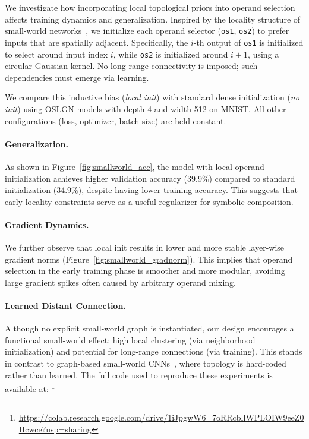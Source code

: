 We investigate how incorporating local topological priors into operand selection affects training dynamics and generalization. Inspired by the locality structure of small-world networks~\cite{watts1998collective}, we initialize each operand selector (\texttt{os1}, \texttt{os2}) to prefer inputs that are spatially adjacent. Specifically, the $i$-th output of \texttt{os1} is initialized to select around input index $i$, while \texttt{os2} is initialized around $i+1$, using a circular Gaussian kernel. No long-range connectivity is imposed; such dependencies must emerge via learning.

We compare this inductive bias (\textit{local init}) with standard dense initialization (\textit{no init}) using OSLGN models with depth 4 and width 512 on MNIST. All other configurations (loss, optimizer, batch size) are held constant.

\paragraph{Generalization.}
As shown in Figure~\ref{fig:smallworld_acc}, the model with local operand initialization achieves higher validation accuracy (39.9\%) compared to standard initialization (34.9\%), despite having lower training accuracy. This suggests that early locality constraints serve as a useful regularizer for symbolic composition.

\paragraph{Gradient Dynamics.}
We further observe that local init results in lower and more stable layer-wise gradient norms (Figure~\ref{fig:smallworld_gradnorm}). This implies that operand selection in the early training phase is smoother and more modular, avoiding large gradient spikes often caused by arbitrary operand mixing.

\paragraph{Learned Distant Connection.}
Although no explicit small-world graph is instantiated, our design encourages a functional small-world effect: high local clustering (via neighborhood initialization) and potential for long-range connections (via training). This stands in contrast to graph-based small-world CNNs~\cite{javaheripi2019swnet}, where topology is hard-coded rather than learned.
The full code used to reproduce these experiments is available at: \footnote{\url{https://colab.research.google.com/drive/1iJpgwW6_7oRRcbllWPLOIW9eeZ0Hcwce?usp=sharing}}

